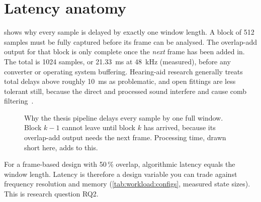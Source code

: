 \section{Latency anatomy}\label{sec:workload:latency}

 shows why every sample is delayed by exactly one
window length. A block of 512 samples must be fully captured before its frame can
be analysed. The overlap-add output for that block is only complete once the
\emph{next} frame has been added in. The total is 1024 samples, or
\qty{21.33}{\ms} at \qty{48}{\kHz} (measured), before any converter or operating
system buffering. Hearing-aid research generally treats total delays above
roughly \qty{10}{\ms} as problematic, and open fittings are less tolerant still,
because the direct and processed sound interfere and cause comb
filtering~\cite{stone1999delay,stone2008delay}.

\begin{figure}[htbp]
\centering
{}
\caption{Why the thesis pipeline delays every sample by one full window. Block
$k-1$ cannot leave until block $k$ has arrived, because its overlap-add output
needs the next frame. Processing time, drawn short here, adds to this.}
\label{fig:workload:latency}
\end{figure}

For a frame-based design with 50\,\% overlap, algorithmic latency equals the
window length. Latency is therefore a design variable you can trade against
frequency resolution and memory (\cref{tab:workload:configs}, measured state
sizes). This is research question RQ2.

